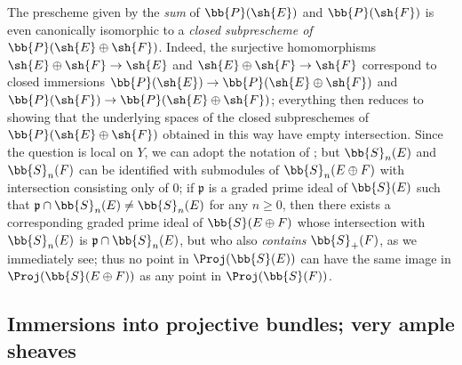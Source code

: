 \begin{remark}[4.3.6]
\label{II.4.3.6}
The prescheme given by the \emph{sum} of $\bb{P}(\sh{E})$ and $\bb{P}(\sh{F})$ is even canonically isomorphic to a \emph{closed subprescheme of $\bb{P}(\sh{E}\oplus\sh{F})$}.
Indeed, the surjective homomorphisms $\sh{E}\oplus\sh{F}\to\sh{E}$ and $\sh{E}\oplus\sh{F}\to\sh{F}$ correspond to closed immersions $\bb{P}(\sh{E})\to\bb{P}(\sh{E}\oplus\sh{F})$ and $\bb{P}(\sh{F})\to\bb{P}(\sh{E}\oplus\sh{F})$;
everything then reduces to showing that the underlying spaces of the closed subpreschemes of $\bb{P}(\sh{E}\oplus\sh{F})$ obtained in this way have empty intersection.
Since the question is local on $Y$, we can adopt the notation of ;
but $\bb{S}_n(E)$ and $\bb{S}_n(F)$ can be identified with submodules of $\bb{S}_n(E\oplus F)$ with intersection consisting only of $0$;
if $\mathfrak{p}$ is a graded prime ideal of $\bb{S}(E)$ such that $\mathfrak{p}\cap\bb{S}_n(E)\neq\bb{S}_n(E)$ for any $n\geq0$, then there exists a corresponding graded prime ideal of $\bb{S}(E\oplus F)$ whose intersection with $\bb{S}_n(E)$ is $\mathfrak{p}\cap\bb{S}_n(E)$, but who also \emph{contains} $\bb{S}_+(F)$, as we immediately see;
thus no point in $\Proj(\bb{S}(E))$ can have the same image in $\Proj(\bb{S}(E\oplus F))$ as any point in $\Proj(\bb{S}(F))$.
\end{remark}


\subsection{Immersions into projective bundles; very ample sheaves}
\label{subsection:II.4.4}

